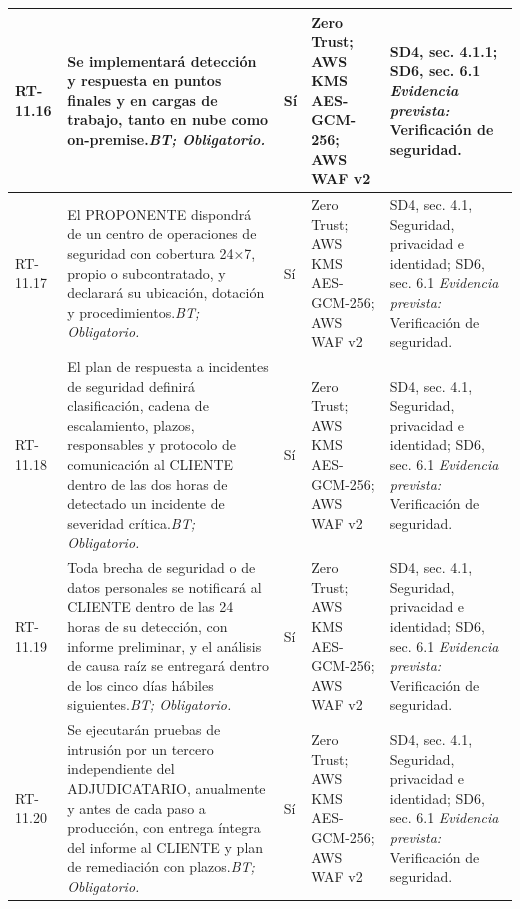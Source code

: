 \begin{paginaHorizontalSynaptix}
\begin{longtable}{|L{0.09\AnchoMatrizTDoce}|L{0.385\AnchoMatrizTDoce}|L{0.065\AnchoMatrizTDoce}|L{0.18\AnchoMatrizTDoce}|L{0.28\AnchoMatrizTDoce}|}
RT-\allowbreak{}11.\allowbreak{}16 &
Se implementará detección y respuesta en puntos finales y en cargas de trabajo, tanto en nube como on-premise.\newline\textit{BT; Obligatorio.} &
Sí &
Zero Trust; AWS KMS AES-GCM-256; AWS WAF v2 &
SD4, sec. 4.1.1; SD6, sec. 6.1 \newline\textit{Evidencia prevista:} Verificación de seguridad. \\ \hline

RT-\allowbreak{}11.\allowbreak{}17 &
El PROPONENTE dispondrá de un centro de operaciones de seguridad con cobertura 24×7, propio o subcontratado, y declarará su ubicación, dotación y procedimientos.\newline\textit{BT; Obligatorio.} &
Sí &
Zero Trust; AWS KMS AES-GCM-256; AWS WAF v2 &
SD4, sec. 4.1, Seguridad, privacidad e identidad; SD6, sec. 6.1 \newline\textit{Evidencia prevista:} Verificación de seguridad. \\ \hline

RT-\allowbreak{}11.\allowbreak{}18 &
El plan de respuesta a incidentes de seguridad definirá clasificación, cadena de escalamiento, plazos, responsables y protocolo de comunicación al CLIENTE dentro de las dos horas de detectado un incidente de severidad crítica.\newline\textit{BT; Obligatorio.} &
Sí &
Zero Trust; AWS KMS AES-GCM-256; AWS WAF v2 &
SD4, sec. 4.1, Seguridad, privacidad e identidad; SD6, sec. 6.1 \newline\textit{Evidencia prevista:} Verificación de seguridad. \\ \hline

RT-\allowbreak{}11.\allowbreak{}19 &
Toda brecha de seguridad o de datos personales se notificará al CLIENTE dentro de las 24 horas de su detección, con informe preliminar, y el análisis de causa raíz se entregará dentro de los cinco días hábiles siguientes.\newline\textit{BT; Obligatorio.} &
Sí &
Zero Trust; AWS KMS AES-GCM-256; AWS WAF v2 &
SD4, sec. 4.1, Seguridad, privacidad e identidad; SD6, sec. 6.1 \newline\textit{Evidencia prevista:} Verificación de seguridad. \\ \hline

RT-\allowbreak{}11.\allowbreak{}20 &
Se ejecutarán pruebas de intrusión por un tercero independiente del ADJUDICATARIO, anualmente y antes de cada paso a producción, con entrega íntegra del informe al CLIENTE y plan de remediación con plazos.\newline\textit{BT; Obligatorio.} &
Sí &
Zero Trust; AWS KMS AES-GCM-256; AWS WAF v2 &
SD4, sec. 4.1, Seguridad, privacidad e identidad; SD6, sec. 6.1 \newline\textit{Evidencia prevista:} Verificación de seguridad. \\ \hline


\end{longtable}
\end{paginaHorizontalSynaptix}

